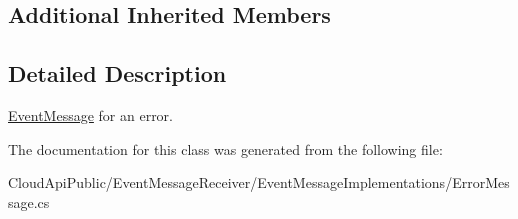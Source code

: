 \subsection*{Additional Inherited Members}


\subsection{Detailed Description}
\hyperlink{class_cloud_api_public_1_1_event_message_receiver_1_1_event_message}{Event\-Message} for an error. 



The documentation for this class was generated from the following file\-:\begin{DoxyCompactItemize}
\item 
Cloud\-Api\-Public/\-Event\-Message\-Receiver/\-Event\-Message\-Implementations/Error\-Message.\-cs\end{DoxyCompactItemize}
